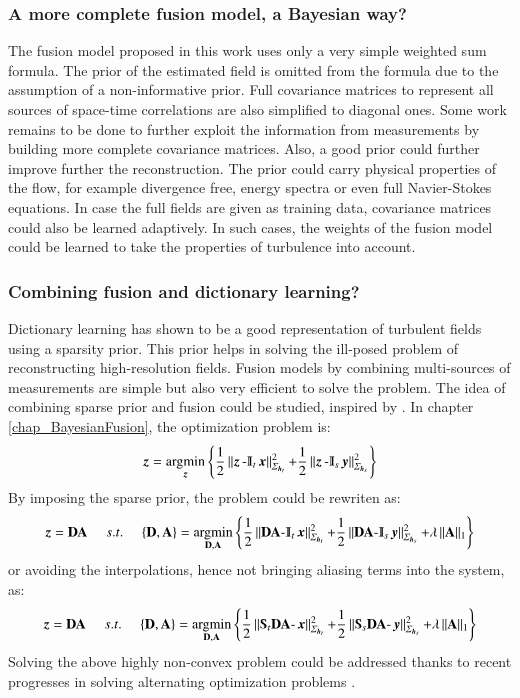 \subsubsection*{A more complete fusion model, a Bayesian way?} The fusion model proposed in this work uses only a very simple weighted sum formula. The prior of the estimated field is omitted from the formula due to the assumption of a non-informative prior. Full covariance matrices to represent all sources of space-time correlations are also simplified to diagonal ones. Some work remains to be done to further exploit the information from measurements by building more complete covariance matrices. Also, a good prior could further improve further the reconstruction. The prior could carry physical properties of the flow, for example divergence free, energy spectra or even full Navier-Stokes equations. In case the full fields are given as training data, covariance matrices could also be learned adaptively. In such cases, the weights of the fusion model could be learned to take the properties of turbulence into account. 

\subsubsection*{Combining fusion and dictionary learning?} Dictionary learning has shown to be a good representation of turbulent fields using a sparsity prior. This prior helps in solving the ill-posed problem of reconstructing high-resolution fields. Fusion models by combining multi-sources of measurements are simple but also very efficient to solve the problem. The idea of combining sparse prior and fusion could be studied, inspired by \citet{wei2015hyperspectral}. In chapter \ref{chap_BayesianFusion}, the optimization problem is:
\begin{equation}
	\z = \argmin_{\z} \left\lbrace \frac{1}{2} \Mdist{\z -\Interp_t\x}{\Sigma_{\h_t}} + \frac{1}{2}\Mdist{\z -\Interp_s\y}{\Sigma_{\h_s}} \right\rbrace
\end{equation}
By imposing the sparse prior, the problem could be rewriten as:
\begin{equation}
	\z = \dict \dictco \subjectto \{\dict,\dictco\} = \argmin_{\dict,\dictco} \left\lbrace \frac{1}{2} \Mdist{\dict \dictco -\Interp_t\x}{\Sigma_{\h_t}} + \frac{1}{2}\Mdist{\dict\dictco -\Interp_s\y}{\Sigma_{\h_s}} + \lambda \normone{\dictco} \right\rbrace
\end{equation}
or avoiding the interpolations, hence not bringing aliasing terms into the system, as:
\begin{equation}
		\z = \dict \dictco \subjectto \{\dict,\dictco\} = \argmin_{\dict,\dictco} \left\lbrace \frac{1}{2} \Mdist{\Sub_t\dict \dictco -\x}{\Sigma_{\h_t}} + \frac{1}{2}\Mdist{\Sub_s\dict\dictco -\y}{\Sigma_{\h_s}} + \lambda \normone{\dictco} \right\rbrace
\end{equation}
Solving the above highly non-convex problem could be addressed thanks to recent progresses in solving alternating optimization problems \citep{boyd2011distributed,parikh2014proximal}. 

